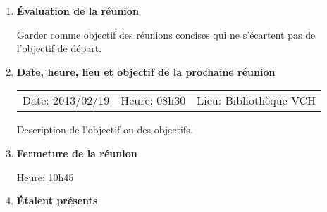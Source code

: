 \documentclass[12pt]{ULojpv}
\begin{document}
\begin{enumerate}
\item \textbf{Évaluation de la réunion}

Garder comme objectif des réunions concises qui ne s'écartent pas de l'objectif de départ.

\item \textbf{Date, heure, lieu et objectif de la prochaine réunion}

\begin{tabular}{@{}lll}
   Date: 2013/02/19
   & Heure: 08h30
   &  Lieu: Bibliothèque VCH
\end{tabular}
\par
Description de l'objectif ou des objectifs.

\item \textbf{Fermeture de la réunion}

Heure: 10h45


\item \textbf{Étaient présents}


\end{enumerate}
\end{document}

